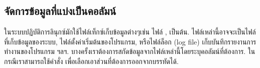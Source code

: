 \begin{thwbr}
\begin{MyExample}
\end{MyExample}%

\subsection{จัดการข้อมูลที่แบ่งเป็นคอลัมน์}
ในระบบปฏิบัติการลินุกซ์มักใช้ไฟล์เท็กซ์เก็บข้อมูลต่างๆเช่น ไฟล์ ,  เป็นต้น. ไฟล์เหล่านี้อาจจะเป็นไฟล์ที่เก็บข้อมูลของระบบ, ไฟล์ตั้งค่าเริ่มต้นของโปรแกรม, หรือไฟล์ล็อก (log file) เก็บบันทึกรายงานการทำงานของโปรแกรม ฯลฯ. บางครั้งเราต้องการสกัดข้อมูลจากไฟล์เหล่านี้โดยระบุคอลัมน์ที่ต้องการ. ในกรณีเราสามารถใช้คำสั่ง  เพื่อเลือกเอาส่วนที่ต้องการออกจากบรรทัดได้.


\end{thwbr}
